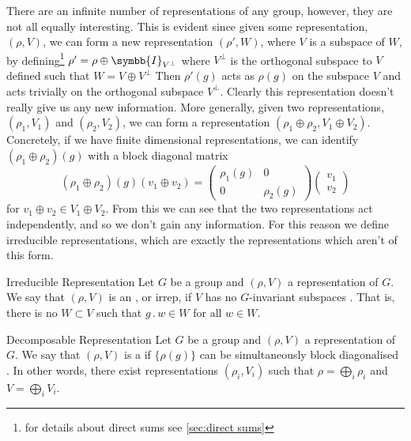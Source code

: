 \documentclass[fleqn]{NotesClass}
\newcommand{\identityMatrix}{\symbb{I}}
\newcommand{\action}{\mathbin{.}}
\begin{document}
    There are an infinite number of representations of any group, however, they are not all equally interesting.
    This is evident since given some representation, \((\rho, V)\), we can form a new representation \((\rho', W)\), where \(V\) is a subspace of \(W\), by defining\footnote{for details about direct sums see \cref{sec:direct sums}} \(\rho' = \rho \oplus \identityMatrix_{V^\perp}\) where \(V^{\perp}\) is the orthogonal subspace to \(V\) defined such that \(W = V \oplus V^{\perp}\)
    Then \(\rho'(g)\) acts as \(\rho(g)\) on the subspace \(V\) and acts trivially on the orthogonal subspace \(V^{\perp}\).
    Clearly this representation doesn't really give us any new information.
    More generally, given two representations, \((\rho_1, V_1)\) and \((\rho_2, V_2)\), we can form a representation \((\rho_1 \oplus \rho_2, V_1 \oplus V_2)\).
    Concretely, if we have finite dimensional representations, we can identify \((\rho_1 \oplus \rho_2)(g)\) with a block diagonal matrix
    \begin{equation}
        (\rho_1 \oplus \rho_2)(g)(v_1 \oplus v_2) = 
        \begin{pmatrix}
            \rho_1(g) & 0\\
            0 & \rho_2(g)
        \end{pmatrix}
        \begin{pmatrix}
            v_1\\ v_2
        \end{pmatrix}
    \end{equation}
    for \(v_1 \oplus v_2 \in V_1 \oplus V_2\).
    From this we can see that the two representations act independently, and so we don't gain any information.
    For this reason we define irreducible representations, which are exactly the representations which aren't of this form.
    
    \begin{dfn}{Irreducible Representation}{}
        Let \(G\) be a group and \((\rho, V)\) a representation of \(G\).
        We say that \((\rho, V)\) is an , or irrep, if \(V\) has no \(G\)-invariant subspaces \cite[95]{hamermesh}.
        That is, there is no \(W \subset V\) such that \(g \action w \in W\) for all \(w \in W\).
    \end{dfn}

    \begin{dfn}{Decomposable Representation}{}
        Let \(G\) be a group and \((\rho, V)\) a representation of \(G\).
        We say that \((\rho, V)\) is a  if \(\{\rho(g)\}\) can be simultaneously block diagonalised \cite[97]{hamermesh}.
        In other words, there exist representations \((\rho_i, V_i)\) such that \(\rho = \bigoplus_i \rho_i\) and \(V = \bigoplus_i V_i\).
    \end{dfn}
    
\end{document}
